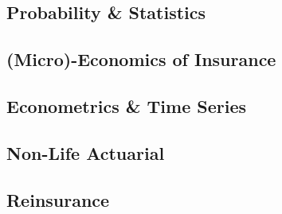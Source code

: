 \documentclass[a4paper]{article}
\theoremstyle{sansparenthese}
\begin{document}
\newpage
\begin{center}
    \section*{Probability \& Statistics}
    \medskip
\end{center}

\begin{multicols}{2}


\end{multicols}

\newpage


\newpage

\begin{center}
    \section*{(Micro)-Economics of Insurance}
    \medskip
\end{center}


\begin{multicols}{2}
	
\end{multicols}

\newpage
\begin{center}
	\section*{Econometrics \& Time Series}
	\medskip
\end{center}


\begin{multicols}{2}
	
\end{multicols}

\newpage


\begin{center}
	\section*{Non-Life Actuarial}
	\medskip
\end{center}

\begin{multicols}{2}	
	
\end{multicols}

\newpage

\begin{center}
	\section*{Reinsurance}
	\medskip
\end{center}
\end{document}
